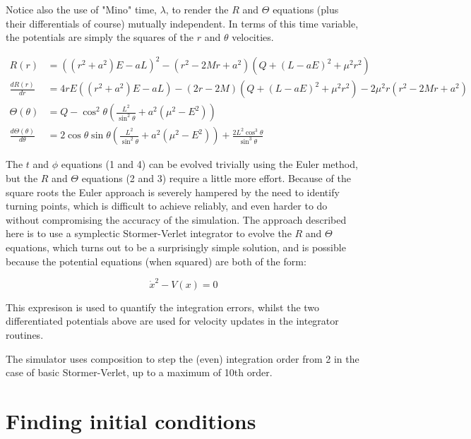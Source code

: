 \documentclass[11pt]{article}
\begin{document}
Notice also the use of "Mino" time, $\lambda$, to render the $R$ and $\Theta$ equations (plus their differentials of course) mutually independent.  In terms of this time variable, the potentials are simply the squares of the $r$ and $\theta$ velocities.

\begin{align}
R(r) &= \left((r^2 + a^2) E - aL \right)^2 - (r^2 - 2Mr  + a^2) \left(Q + ( L - aE)^2 + \mu^2 r^2 \right) \\
\frac{d R(r)}{d r} &= 4rE \left((r^2 + a^2)E - aL \right) - (2r - 2M) \left(Q + ( L - aE)^2 + \mu^2 r^2 \right) - 2\mu^2r(r^2 - 2Mr  + a^2) \\
\Theta (\theta) &= Q - {\cos^2 \theta } \left( \frac{L^2}{\sin^2 \theta } + a^2( \mu^2 - E^2) \right) \\
\frac{d \Theta (\theta)}{d \theta} &= 2 \cos \theta \sin \theta \left(\frac{L^2} {\sin^2 \theta } + a^2(\mu^2 - E^2) \right) +\frac{2 L^2 \cos^3 \theta } {\sin^3 \theta }
\end{align}

The $t$ and $\phi$ equations (1 and 4) can be evolved trivially using the Euler method, but the $R$ and $\Theta$ equations (2 and 3) require a little more effort.  Because of the square roots the Euler approach is severely hampered by the need to identify turning points, which is difficult to achieve reliably, and even harder to do without compromising the accuracy of the simulation.  The approach described here is to use a symplectic Stormer-Verlet integrator \cite{hairer} to evolve the $R$ and $\Theta$ equations, which turns out to be a surprisingly simple solution, and is possible because the potential equations (when squared) are both of the form:

\begin{equation}
\dot x^2 - V(x) = 0
\end{equation}

This expresison is used to quantify the integration errors, whilst the two differentiated potentials above are used for velocity updates in the integrator routines.

The simulator uses composition \cite{hairer} to step the (even) integration order from 2 in the case of basic Stormer-Verlet, up to a maximum of 10th order.

\section{Finding initial conditions}
\end{document}
